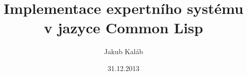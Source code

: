 \documentclass[12pt]{article}
\title{Implementace expertního systému v jazyce Common Lisp}
\author{Jakub Kaláb}
\date{31.12.2013}
\begin{document}
\maketitle
\renewcommand\listoflistingscaption{Seznam příkladů}
\renewcommand\listingscaption{Příklad}
\listoflistings
{}






\clearpage
\renewcommand\refname{Seznam použité literatury}


\end{document}
